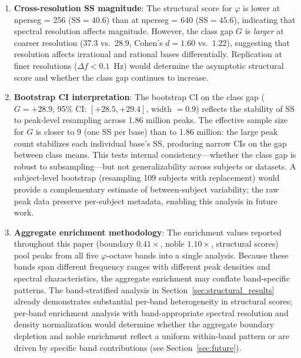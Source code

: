 \documentclass[11pt,a4paper]{article}
\newcommand{\phisym}{\varphi}
\begin{document}
\begin{enumerate}
    \item \textbf{Cross-resolution SS magnitude}: The structural score for $\phisym$ is lower at nperseg = 256 ($\text{SS} = 40.6$) than at nperseg = 640 ($\text{SS} = 45.6$), indicating that spectral resolution affects magnitude. However, the class gap $G$ is \emph{larger} at coarser resolution ($37.3$ vs.\ $28.9$, Cohen's $d = 1.60$ vs.\ $1.22$), suggesting that resolution affects irrational and rational bases differentially. Replication at finer resolutions ($\Delta f < 0.1$~Hz) would determine the asymptotic structural score and whether the class gap continues to increase.

    \item \textbf{Bootstrap CI interpretation}: The bootstrap CI on the class gap ($G = +28.9$, 95\% CI: $[+28.5, +29.4]$, width $= 0.9$) reflects the stability of SS to peak-level resampling across 1.86 million peaks. The effective sample size for $G$ is closer to 9 (one SS per base) than to 1.86 million: the large peak count stabilizes each individual base's SS, producing narrow CIs on the gap between class means. This tests internal consistency---whether the class gap is robust to subsampling---but not generalizability across subjects or datasets. A subject-level bootstrap (resampling 109 subjects with replacement) would provide a complementary estimate of between-subject variability; the raw peak data preserve per-subject metadata, enabling this analysis in future work.

    \item \textbf{Aggregate enrichment methodology}: The enrichment values reported throughout this paper (boundary $0.41\times$, noble $1.10\times$, structural scores) pool peaks from all five $\phisym$-octave bands into a single analysis. Because these bands span different frequency ranges with different peak densities and spectral characteristics, the aggregate enrichment may conflate band-specific patterns. The band-stratified analysis in Section~\ref{sec:structural_results} already demonstrates substantial per-band heterogeneity in structural scores; per-band enrichment analysis with band-appropriate spectral resolution and density normalization would determine whether the aggregate boundary depletion and noble enrichment reflect a uniform within-band pattern or are driven by specific band contributions (see Section~\ref{sec:future}).
\end{enumerate}
\end{document}
